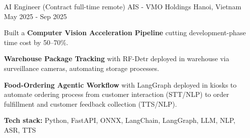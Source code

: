 \begin{cventries}

  \cventry
    {AI Engineer (Contract full-time remote)}
    {AIS - VMO Holdings}
    {Hanoi, Vietnam}
    {May 2025 - Sep 2025}
    {
      \begin{cvitems}
        \item {Built a \textbf{Computer Vision Acceleration Pipeline} cutting development-phase time cost by 50--70\%.}
        \item {\textbf{Warehouse Package Tracking} with RF-Detr deployed in warehouse via surveillance cameras, automating storage processes.}
        \item {\textbf{Food-Ordering Agentic Workflow} with LangGraph deployed in kiosks to automate ordering process from customer interaction (STT/NLP) to order fulfillment and customer feedback collection (TTS/NLP).}
        \item {\textbf{Tech stack:} Python, FastAPI, ONNX, LangChain, LangGraph, LLM, NLP, ASR, TTS}
      \end{cvitems}
    }



\end{cventries}
